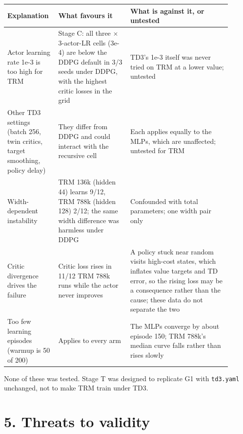 \documentclass[11pt]{article}
\begin{document}
\begin{center}\small\begin{tabular}{>{\raggedright\arraybackslash}p{0.172\linewidth}>{\raggedright\arraybackslash}p{0.307\linewidth}>{\raggedright\arraybackslash}p{0.427\linewidth}}
\toprule
Explanation & What favours it & What is against it, or untested \\
\midrule
Actor learning rate 1e-3 is too high for TRM & Stage C: all three $\times$3-actor-LR cells (3e-4) are below the DDPG default in 3/3 seeds under DDPG, with the highest critic losses in the grid & TD3's 1e-3 itself was never tried on TRM at a lower value; untested \\
Other TD3 settings (batch 256, twin critics, target smoothing, policy delay) & They differ from DDPG and could interact with the recursive cell & Each applies equally to the MLPs, which are unaffected; untested for TRM \\
Width-dependent instability & TRM 136k (hidden 44) learns 9/12, TRM 788k (hidden 128) 2/12; the same width difference was harmless under DDPG & Confounded with total parameters; one width pair only \\
Critic divergence drives the failure & Critic loss rises in 11/12 TRM 788k runs while the actor never improves & A policy stuck near random visits high-cost states, which inflates value targets and TD error, so the rising loss may be a consequence rather than the cause; these data do not separate the two \\
Too few learning episodes (warmup is 50 of 200) & Applies to every arm & The MLPs converge by about episode 150; TRM 788k's median curve falls rather than rises slowly \\
\bottomrule
\end{tabular}\end{center}



None of these was tested. Stage T was designed to replicate G1 with \texttt{td3.yaml} unchanged, not to make TRM train under TD3.



\section*{5. Threats to validity}
\end{document}
